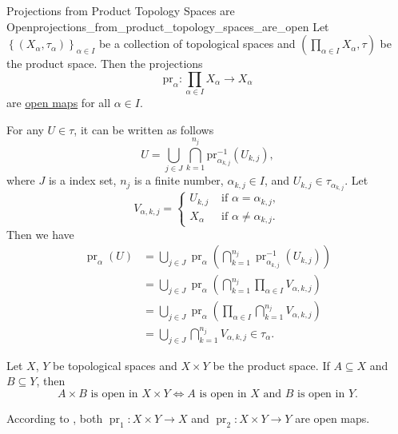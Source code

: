 \documentclass{report}
\begin{document}
\begin{proposition}{Projections from Product Topology Spaces are Open}{projections_from_product_topology_spaces_are_open}
	Let $\left\{(X_\alpha,\tau_\alpha)\right\}_{\alpha\in I}$ be a collection of topological spaces and $\left(\prod_{\alpha\in I}X_\alpha,\tau\right)$ be the product space. Then the projections 
	\[
	\mathrm{pr}_\alpha:\prod_{\alpha\in I}X_\alpha \to X_\alpha
	\]
	are \hyperref[th:open_map]{open maps} for all $\alpha\in I$.
\end{proposition}
\begin{prf}
	For any $U\in \tau$, it can be written as follows
	\[
		U = \bigcup_{j \in J} \bigcap_{k  = 1}^{n_j} \mathrm{pr}_{\alpha_{k, j} }^{-1}\left(U_{k, j} \right),
	\]
	where $J$ is a index set, $n_j$ is a finite number, $\alpha_{k, j} \in I$, and $U_{k, j} \in \tau_{\alpha_{k, j}}$. Let
	\[
		V_{\alpha, k, j} = \begin{cases}
			U_{k, j} & \text{ if } \alpha = \alpha_{k, j}, \\
			 X_{\alpha} & \text{ if }\alpha \ne \alpha_{k, j} .
			\end{cases}
	\]
	Then we have
	\begin{align*}
		\operatorname{pr}_\alpha(U)&=\bigcup_{j \in J} \operatorname{pr}_\alpha\left(\bigcap_{k=1}^{n_j} \operatorname{pr}_{\alpha_{k,j}}^{-1}\left(U_{k,j}\right)\right)\\
		&=\bigcup_{j \in J} \operatorname{pr}_\alpha\left(\bigcap_{k=1}^{n_j} \prod_{\alpha\in I}V_{\alpha,k,j}\right)\\
		&=\bigcup_{j \in J} \operatorname{pr}_\alpha\left(\prod_{\alpha\in I}\bigcap_{k=1}^{n_j} V_{\alpha,k,j}\right)\\
		&=\bigcup_{j \in J} \bigcap_{k=1}^{n_j} V_{\alpha,k,j}\in \tau_\alpha.
	\end{align*}
\end{prf}
\begin{corollary}{}{}
	Let $X$, $Y$ be topological spaces and $X\times Y$ be the product space. If $A\subseteq X$ and $B\subseteq Y$, then 
	\[
		A\times B\text{ is open in }X\times Y\iff A\text{ is open in }X\text{ and }B\text{ is open in }Y.
	\]
\end{corollary}
\begin{prf}
	According to , both $\operatorname{pr}_1:X\times Y\to X$ and $\operatorname{pr}_2:X\times Y\to Y$ are open maps.
\end{prf}
\end{document}
